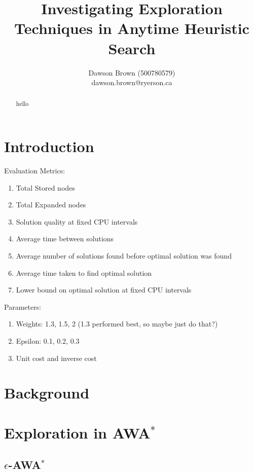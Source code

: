 \documentclass{llncs}
\title{Investigating Exploration Techniques in Anytime Heuristic Search}
\author{Dawson Brown (500780579)\\dawson.brown@ryerson.ca}
\institute{Ryerson University}
\date{}
\begin{document}
\maketitle
\pagestyle{plain}

\begin{abstract}
    hello
\end{abstract}


\section{Introduction}

Evaluation Metrics:
\begin{enumerate}
    \item Total Stored nodes \cite{hansen2007anytime}
    \item Total Expanded nodes \cite{hansen2007anytime}
    \item Solution quality at fixed CPU intervals \cite{thayer2012better}
    \item Average time between solutions \cite{thayer2012better}
    \item Average number of solutions found before optimal solution was found
    \item Average time taken to find optimal solution
    \item Lower bound on optimal solution at fixed CPU intervals
\end{enumerate}


Parameters:
\begin{enumerate}
    \item Weights: 1.3, 1.5, 2 \cite{hansen2007anytime} (1.3 performed best, so maybe just do that?)
    \item Epsilon: 0.1, 0.2, 0.3 \cite{valenzano2014comparison}
    \item Unit cost and inverse cost
\end{enumerate}


\section{Background}



\section{Exploration in AWA$^*$}

\subsection{$\epsilon$-AWA$^*$}
\end{document}
